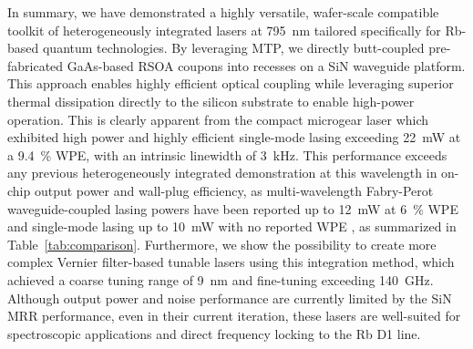 \documentclass[%
 reprint,
 amsmath,amssymb,
 aps,
]{revtex4-2}
\begin{document}
In summary, we have demonstrated a highly versatile, wafer-scale compatible toolkit of heterogeneously integrated lasers at 795~nm tailored specifically for Rb-based quantum technologies. By leveraging MTP, we directly butt-coupled pre-fabricated GaAs-based RSOA coupons into recesses on a SiN waveguide platform. This approach enables highly efficient optical coupling while leveraging superior thermal dissipation directly to the silicon substrate to enable high-power operation. This is clearly apparent from the compact microgear laser which exhibited high power and highly efficient single-mode lasing exceeding 22~mW at a 9.4~\% WPE, with an intrinsic linewidth of 3~kHz. This performance exceeds any previous heterogeneously integrated demonstration at this wavelength in on-chip output power and wall-plug efficiency, as multi-wavelength Fabry-Perot waveguide-coupled lasing powers have been reported up to 12~mW at 6~\% WPE \cite{zhang2023photonic} and single-mode lasing up to 10~mW with no reported WPE \cite{thiel2026wafer}, as summarized in Table~\ref{tab:comparison}. Furthermore, we show the possibility to create more complex Vernier filter-based tunable lasers using this integration method, which achieved a coarse tuning range of 9~nm and fine-tuning exceeding 140~GHz. Although output power and noise performance are currently limited by the SiN MRR performance, even in their current iteration, these lasers are well-suited for spectroscopic applications and direct frequency locking to the Rb D1 line. 
\end{document}
